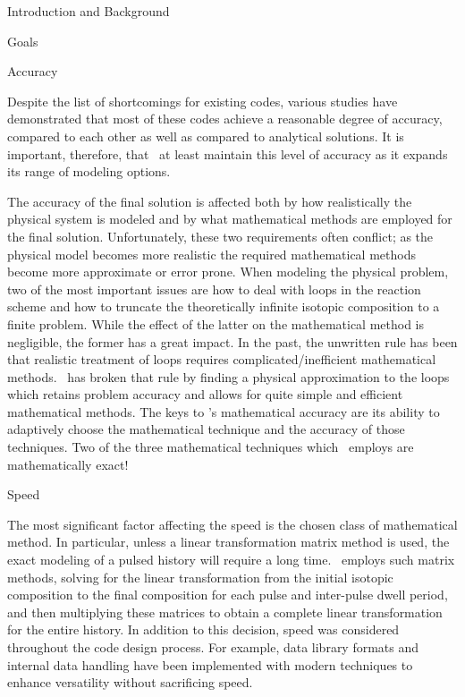 \begin{chapter}{Introduction and Background}
\begin{section}{Goals}
    \begin{subsection}{Accuracy\label{ssec:intro.goals.acc}}
    
      Despite the list of shortcomings for existing codes, various
      studies\cite{IAEA.bench2.rep,IAEA.bench1.results} have
      demonstrated that most of these codes achieve a reasonable
      degree of accuracy, compared to each other as well as compared
      to analytical solutions.  It is important, therefore, that
      \ALARA\ at least maintain this level of accuracy as it expands
      its range of modeling options.
  
      The accuracy of the final solution is affected both by how
      realistically the physical system is modeled and by what
      mathematical methods are employed for the final solution.
      Unfortunately, these two requirements often conflict; as the
      physical model becomes more realistic the required mathematical
      methods become more approximate or error prone.  When modeling
      the physical problem, two of the most important issues are how
      to deal with loops in the reaction scheme and how to truncate
      the theoretically infinite isotopic composition to a finite
      problem.  While the effect of the latter on the mathematical
      method is negligible, the former has a great impact.  In the
      past, the unwritten rule has been that realistic treatment of
      loops requires complicated/inefficient mathematical methods.
      \ALARA\ has broken that rule by finding a physical approximation
      to the loops which retains problem accuracy and allows for quite
      simple and efficient mathematical methods.  The keys to \ALARA's
      mathematical accuracy are its ability to adaptively choose the
      mathematical technique and the accuracy of those techniques.
      Two of the three mathematical techniques which \ALARA\ employs
      are mathematically exact!

    \end{subsection}
    
    \begin{subsection}{Speed\label{ssec:intro.goals.speed}}
      
      The most significant factor affecting the speed is the chosen
      class of mathematical method.  In particular, unless a linear
      transformation matrix method is used, the exact modeling of a
      pulsed history will require a long time.  \ALARA\ employs such
      matrix methods, solving for the linear transformation from the
      initial isotopic composition to the final composition for each
      pulse and inter-pulse dwell period, and then multiplying these
      matrices to obtain a complete linear transformation for the
      entire history.  In addition to this decision, speed was
      considered throughout the code design process.  For example,
      data library formats and internal data handling have been
      implemented with modern techniques to enhance versatility
      without sacrificing speed.


\end{subsection}
\end{section}
\end{chapter}
